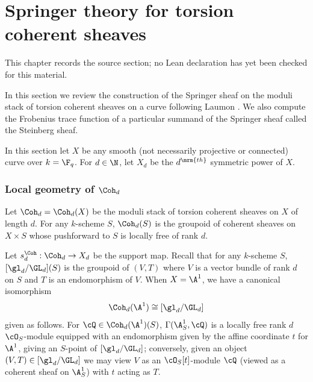 \chapter{Springer theory for torsion coherent sheaves}
\label{higher-siegel-weil-unitary-nonsingular-terms-chapter-03}

\begin{remark}
\label{higher-siegel-weil-unitary-nonsingular-terms-chapter-03-source}
This chapter records the source section; no Lean declaration has yet been checked for this material.
\notready
\end{remark}

\label{sec: springer}
In this section we review the construction of the Springer sheaf on the moduli stack of torsion coherent sheaves on a curve following Laumon \cite{Lau87}. We also compute the Frobenius trace function of a particular summand of the Springer sheaf called the Steinberg sheaf.

In this section let $X$ be any smooth (not necessarily projective or connected) curve over $k=\F_{q}$.  For $d\in \N$, let $X_{d}$ be the $d^{\mrm{th}}$ symmetric power of $X$.

\subsection{Local geometry of $\Coh_{d}$}\label{ss:Coh loc}
Let $\Coh_{d}=\Coh_{d}(X)$ be the moduli stack of torsion coherent sheaves on $X$ of length $d$. For any $k$-scheme $S$, $\Coh_d(S)$ is the groupoid of coherent sheaves on $X \times S$ whose pushforward to $S$ is locally free of rank $d$.

Let $s^{\Coh}_{d}: \Coh_{d}\to X_{d}$ be the support map. Recall that for any $k$-scheme $S$, $[\gl_{d}/\GL_{d}](S)$ is the groupoid of $(V, T)$ where $V$ is a vector bundle of rank $d$ on $S$ and $T$ is an endomorphism of $V$. When $X=\A^{1}$, we have a canonical isomorphism
\begin{equation*}
\Coh_{d}(\A^{1})\cong [\gl_{d}/\GL_{d}]
\end{equation*}
given as follows. For $\cQ\in \Coh_{d}(\A^{1})(S)$, $\Gamma(\A^{1}_{S},\cQ)$ is a locally free rank $d$ $\cO_{S}$-module equipped with an endomorphism given by the affine coordinate $t$ for $\A^{1}$, giving an $S$-point of $[\gl_{d}/\GL_{d}]$; conversely, given an object $(V,T) \in [\gl_{d}/\GL_{d}]$ we may view $V$ as an $\cO_{S}[t]$-module $\cQ$ (viewed as a coherent sheaf on $\A^{1}_{S}$) with $t$ acting as $T$.

